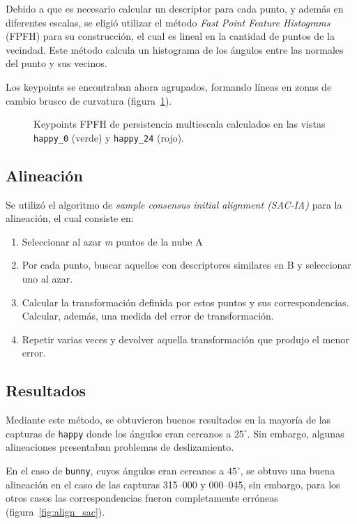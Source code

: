 			Debido a que es necesario calcular un descriptor para cada punto, y
			además en diferentes escalas, se eligió utilizar el método
			\emph{Fast Point Feature Histograms} (FPFH) para su construcción,
			el cual es lineal en la cantidad de puntos de la vecindad.
			Este método calcula un histograma de los ángulos entre las normales del punto y sus vecinos\cite{Rusu:2009:FPF:1703435.1703733}.

			Los keypoints se encontraban ahora agrupados, formando líneas en zonas de cambio brusco de curvatura (figura~\ref{fig:multiscale_key}).

			\begin{figure}
				\caption{\label{fig:multiscale_key}Keypoints FPFH de persistencia multiescala calculados en las vistas \texttt{happy\_0} (verde) y \texttt{happy\_24} (rojo).}
			\end{figure}




		\subsection{Alineación}
			Se utilizó el algoritmo de \emph{sample consensus initial alignment (SAC-IA)} para la alineación, el cual consiste en:
			\begin{enumerate}
				\item Seleccionar al azar \emph{m} puntos de la nube A
				\item Por cada punto, buscar aquellos con descriptores similares en B y seleccionar uno al azar.
				\item Calcular la transformación definida por estos puntos y
					sus correspondencias. Calcular, además, una medida del
					error de transformación.
				\item Repetir varias veces y devolver aquella transformación que produjo el menor error.
			\end{enumerate}

			\subsection{Resultados}
			Mediante este método, se obtuvieron buenos resultados en la mayoría de las
			capturas de \texttt{happy}
			donde los ángulos eran cercanos a $25^{\circ}$.
			Sin embargo, algunas alineaciones presentaban problemas de deslizamiento.

			En el caso de \texttt{bunny}, cuyos ángulos eran cercanos a $45^{\circ}$,
			se obtuvo una buena alineación en el caso de las capturas 315--000 y 000--045,
			sin embargo, para los otros casos las correspondencias fueron completamente erróneas (figura~\ref{fig:align_sac}).

